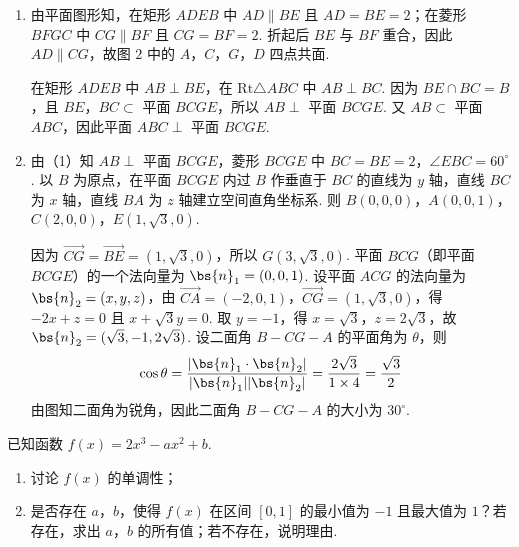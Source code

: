 \begin{solution}
\begin{enumerate}
\item 由平面图形知，在矩形 \(ADEB\) 中 \(AD\parallel BE\) 且 \(AD=BE=2\)；在菱形 \(BFGC\) 中 \(CG\parallel BF\) 且 \(CG=BF=2\). 折起后 \(BE\) 与 \(BF\) 重合，因此 \(AD\parallel CG\)，故图 \(2\) 中的 \(A\)，\(C\)，\(G\)，\(D\) 四点共面.

在矩形 \(ADEB\) 中 \(AB\perp BE\)，在 \(\mathrm{Rt}\triangle ABC\) 中 \(AB\perp BC\). 因为 \(BE\cap BC=B\)，且 \(BE\)，\(BC\subset\) 平面 \(BCGE\)，所以 \(AB\perp\) 平面 \(BCGE\). 又 \(AB\subset\) 平面 \(ABC\)，因此平面 \(ABC\perp\) 平面 \(BCGE\).

\item 由（1）知 \(AB\perp\) 平面 \(BCGE\)，菱形 \(BCGE\) 中 \(BC=BE=2\)，\(\angle EBC=60^\circ\). 以 \(B\) 为原点，在平面 \(BCGE\) 内过 \(B\) 作垂直于 \(BC\) 的直线为 \(y\) 轴，直线 \(BC\) 为 \(x\) 轴，直线 \(BA\) 为 \(z\) 轴建立空间直角坐标系. 则 \(B(0,0,0)\)，\(A(0,0,1)\)，\(C(2,0,0)\)，\(E(1,\sqrt3,0)\).

因为 \(\overrightarrow{CG}=\overrightarrow{BE}=(1,\sqrt3,0)\)，所以 \(G(3,\sqrt3,0)\). 平面 \(BCG\)（即平面 \(BCGE\)）的一个法向量为 \(\bs{n}_1=(0,0,1)\). 设平面 \(ACG\) 的法向量为 \(\bs{n}_2=(x,y,z)\)，由 \(\overrightarrow{CA}=(-2,0,1)\)，\(\overrightarrow{CG}=(1,\sqrt3,0)\)，得 \(-2x+z=0\) 且 \(x+\sqrt3y=0\). 取 \(y=-1\)，得 \(x=\sqrt3\)，\(z=2\sqrt3\)，故 \(\bs{n}_2=(\sqrt3,-1,2\sqrt3)\). 设二面角 \(B-CG-A\) 的平面角为 \(\theta\)，则
\[
\cos\theta=\frac{|\bs{n}_1\cdot\bs{n}_2|}{|\bs{n}_1||\bs{n}_2|}=\frac{2\sqrt3}{1\times4}=\frac{\sqrt3}{2}
\]
由图知二面角为锐角，因此二面角 \(B-CG-A\) 的大小为 \(30^\circ\).
\end{enumerate}
\end{solution}

\begin{problem}
已知函数 \(f(x)=2x^3-ax^2+b\).

\begin{enumerate}
\item 讨论 \(f(x)\) 的单调性；
\item 是否存在 \(a\)，\(b\)，使得 \(f(x)\) 在区间 \([0,1]\) 的最小值为 \(-1\) 且最大值为 \(1\)？若存在，求出 \(a\)，\(b\) 的所有值；若不存在，说明理由.
\end{enumerate}
\end{problem}


